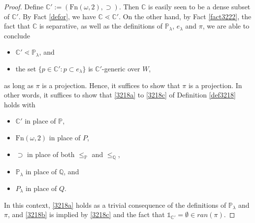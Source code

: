 \documentclass[12pt, twoside]{memoir}
\numberwithin{equation}{section}
\theoremstyle{definition}
\theoremstyle{remark}
\theoremstyle{definition}
\theoremstyle{definition}
\theoremstyle{definition}
\theoremstyle{remark}
\begin{document}
\begin{proof}
Define $\mathbb{C}' := (\mathrm{Fn}(\omega, 2), \supset)$. Then $\mathbb{C}$ is easily seen to be a dense subset of $\mathbb{C}'$. By Fact \ref{defor}, we have $\mathbb{C} \lessdot \mathbb{C}'$. On the other hand, by Fact \ref{fact3222}, the fact that $\mathbb{C}$ is separative, as well as the definitions of $\mathbb{P}_{\lambda}$, $e_{\lambda}$ and $\pi$, we are able to conclude 
\begin{itemize}
    \item $\mathbb{C}' \lessdot \mathbb{P}_{\lambda}$, and 
    \item the set $\{p \in \mathbb{C}' : p \subset e_{\lambda}\}$ is $\mathbb{C}'$-generic over $W$,
\end{itemize}
as long as $\pi$ is a projection. Hence, it suffices to show that $\pi$ is a projection. In other words, it suffices to show that \ref{3218a} to \ref{3218c} of Definition \ref{def3218} holds with 
\begin{itemize}
    \item $\mathbb{C}'$ in place of $\mathbb{P}$, 
    \item $\mathrm{Fn}(\omega, 2)$ in place of $P$,
    \item $\supset$ in place of both $\leq_{\mathbb{P}}$ and $\leq_{\mathbb{Q}}$,
    \item $\mathbb{P}_{\lambda}$ in place of $\mathbb{Q}$, and
    \item $P_{\lambda}$ in place of $Q$.
\end{itemize}
In this context, \ref{3218a} holds as a trivial consequence of the definitions of $\mathbb{P}_{\lambda}$ and $\pi$, and \ref{3218b} is implied by \ref{3218c} and the fact that $\mathbb{1}_{\mathbb{C}'} = \emptyset \in ran(\pi)$. 


\end{proof}
\end{document}
